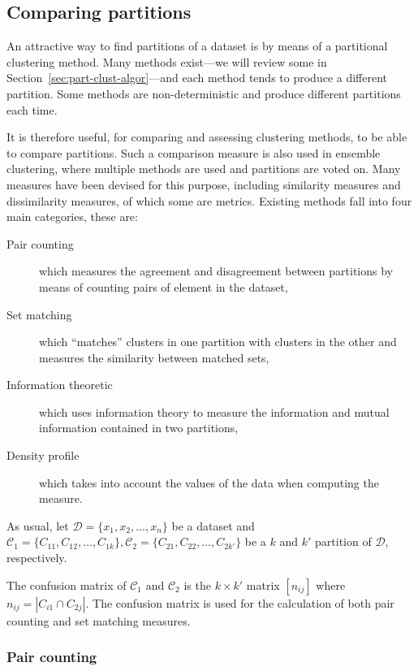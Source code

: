 \documentclass[a4paper]{report}
\newcommand{\dset}{\mathcal{D}}
\newcommand{\clus}{\mathcal{C}}
\begin{document}
\subsection{Comparing partitions}
\label{sec:comparing-partitions}

An attractive way to find partitions of a dataset is by means of a partitional
clustering method.  Many methods exist---we will review some in
Section~\ref{sec:part-clust-algor}---and each method tends to produce
a different partition.  Some methods are non-deterministic and produce
different partitions each time.

It is therefore useful, for comparing and assessing clustering methods, to be
able to compare partitions.  Such a comparison measure is also used in
ensemble clustering, where multiple methods are used and partitions are voted
on.  Many measures have been devised for this purpose, including similarity
measures and dissimilarity measures, of which some are metrics.  Existing
methods fall into four main categories, these are:
\begin{description}
\item[Pair counting] which measures the agreement and disagreement between
  partitions by means of counting pairs of element in the dataset,
\item[Set matching] which ``matches'' clusters in one partition with clusters
  in the other and measures the similarity between matched sets,
\item[Information theoretic] which uses information theory to measure the
  information and mutual information contained in two partitions,
\item[Density profile] which takes into account the values of the data when
  computing the measure.
\end{description}

As usual, let $\dset = \{x_1,x_2,\dotsc,x_n\}$ be a dataset and $\clus_1 =
\{C_{11},C_{12},\dotsc,C_{1k}\},\clus_2 = \{C_{21},C_{22},\dotsc,C_{2k'}\}$ be
a $k$ and $k'$ partition of $\dset$, respectively.

The confusion matrix of $\clus_1$ and $\clus_2$ is the $k \times k'$ matrix
$[n_{ij}]$ where $n_{ij} = |C_{i1} \cap C_{2j}|$.  The confusion matrix is
used for the calculation of both pair counting and set matching measures.

\subsubsection{Pair counting}
\label{sec:pair-counting}
\end{document}
